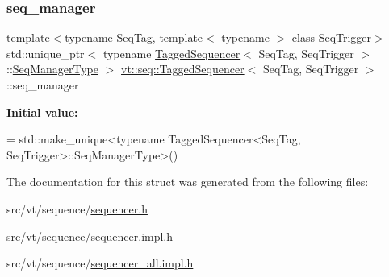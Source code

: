\subsubsection{\texorpdfstring{seq\+\_\+manager}{seq\_manager}}
{\footnotesize\ttfamily template$<$typename Seq\+Tag, template$<$ typename $>$ class Seq\+Trigger$>$ \\
std\+::unique\+\_\+ptr$<$ typename \hyperlink{structvt_1_1seq_1_1_tagged_sequencer}{Tagged\+Sequencer}$<$ Seq\+Tag, Seq\+Trigger $>$\+::\hyperlink{structvt_1_1seq_1_1_tagged_sequencer_a892e0a759dc975bf74e35f9ebf7a2967}{Seq\+Manager\+Type} $>$ \hyperlink{structvt_1_1seq_1_1_tagged_sequencer}{vt\+::seq\+::\+Tagged\+Sequencer}$<$ Seq\+Tag, Seq\+Trigger $>$\+::seq\+\_\+manager\hspace{0.3cm}{\ttfamily [static]}}

{\bfseries Initial value\+:}
\begin{DoxyCode}
=
    std::make\_unique<typename TaggedSequencer<SeqTag, SeqTrigger>::SeqManagerType>()
\end{DoxyCode}


The documentation for this struct was generated from the following files\+:\begin{DoxyCompactItemize}
\item 
src/vt/sequence/\hyperlink{sequencer_8h}{sequencer.\+h}\item 
src/vt/sequence/\hyperlink{sequencer_8impl_8h}{sequencer.\+impl.\+h}\item 
src/vt/sequence/\hyperlink{sequencer__all_8impl_8h}{sequencer\+\_\+all.\+impl.\+h}\end{DoxyCompactItemize}
